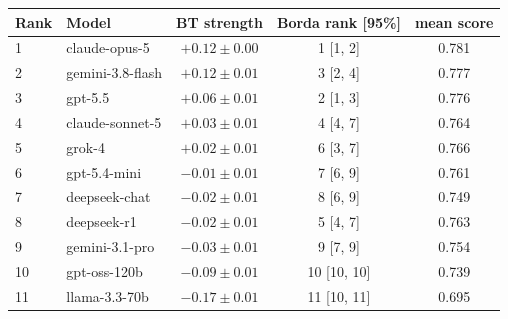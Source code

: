 \begin{tabular}{llccc}
\toprule
Rank & Model & BT strength & Borda rank [95\%] & mean score \\
\midrule
1 & claude-opus-5 & $+0.12 \pm 0.00$ & 1 [1, 2] & 0.781 \\
2 & gemini-3.8-flash & $+0.12 \pm 0.01$ & 3 [2, 4] & 0.777 \\
3 & gpt-5.5 & $+0.06 \pm 0.01$ & 2 [1, 3] & 0.776 \\
4 & claude-sonnet-5 & $+0.03 \pm 0.01$ & 4 [4, 7] & 0.764 \\
5 & grok-4 & $+0.02 \pm 0.01$ & 6 [3, 7] & 0.766 \\
6 & gpt-5.4-mini & $-0.01 \pm 0.01$ & 7 [6, 9] & 0.761 \\
7 & deepseek-chat & $-0.02 \pm 0.01$ & 8 [6, 9] & 0.749 \\
8 & deepseek-r1 & $-0.02 \pm 0.01$ & 5 [4, 7] & 0.763 \\
9 & gemini-3.1-pro & $-0.03 \pm 0.01$ & 9 [7, 9] & 0.754 \\
10 & gpt-oss-120b & $-0.09 \pm 0.01$ & 10 [10, 10] & 0.739 \\
11 & llama-3.3-70b & $-0.17 \pm 0.01$ & 11 [10, 11] & 0.695 \\
\bottomrule
\end{tabular}
